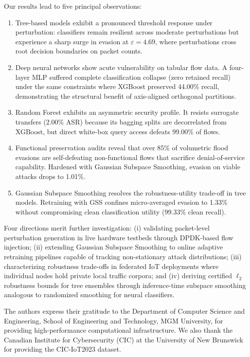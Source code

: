 \documentclass[iicol,pdflatex,sn-mathphys-num]{sn-jnl}
\begin{document}
Our results lead to five principal observations:
\begin{enumerate}\setlength{\itemsep}{1pt}\setlength{\parskip}{0pt}
    \item Tree-based models exhibit a pronounced threshold response under perturbation: classifiers remain resilient across moderate perturbations but experience a sharp surge in evasion at $\varepsilon = 4.69$, where perturbations cross root decision boundaries on packet counts.
    \item Deep neural networks show acute vulnerability on tabular flow data. A four-layer MLP suffered complete classification collapse (zero retained recall) under the same constraints where XGBoost preserved 44.00\% recall, demonstrating the structural benefit of axis-aligned orthogonal partitions.
    \item Random Forest exhibits an asymmetric security profile. It resists surrogate transfers (2.00\% ASR) because its bagging splits are decorrelated from XGBoost, but direct white-box query access defeats 99.00\% of flows.
    \item Functional preservation audits reveal that over 85\% of volumetric flood evasions are self-defeating non-functional flows that sacrifice denial-of-service capability. Hardened with Gaussian Subspace Smoothing, evasion on viable attacks drops to 1.01\%.
    \item Gaussian Subspace Smoothing resolves the robustness-utility trade-off in tree models. Retraining with GSS confines micro-averaged evasion to 1.33\% without compromising clean classification utility (99.33\% clean recall).
\end{enumerate}

Four directions merit further investigation: (i) validating packet-level perturbation generation in live hardware testbeds through DPDK-based flow injection; (ii) extending Gaussian Subspace Smoothing to online adaptive retraining pipelines capable of tracking non-stationary attack distributions; (iii) characterizing robustness trade-offs in federated IoT deployments where individual nodes hold private local traffic corpora; and (iv) deriving certified $\ell_2$ robustness bounds for tree ensembles through inference-time subspace smoothing analogous to randomized smoothing for neural classifiers.


The authors express their gratitude to the Department of Computer Science and Engineering, School of Engineering and Technology, MGM University, for providing high-performance computational infrastructure. We also thank the Canadian Institute for Cybersecurity (CIC) at the University of New Brunswick for providing the CIC-IoT2023 dataset.
\end{document}
